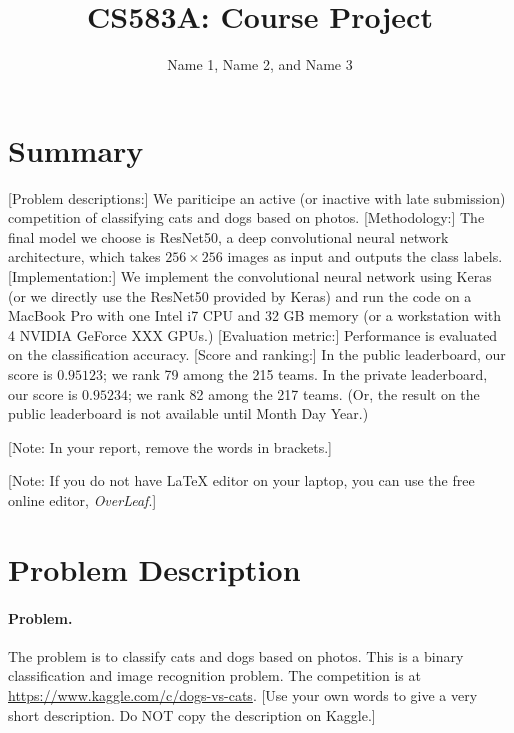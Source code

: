 \documentclass[11pt]{article}
\numberwithin{equation}{section}
\begin{document}
\title{CS583A: Course Project}

\author{Name 1, Name 2, and Name 3}


\maketitle




\section{Summary}

[Problem descriptions:] We pariticipe an active (or inactive with late submission) competition of classifying cats and dogs based on photos. 
[Methodology:] The final model we choose is ResNet50, a deep convolutional neural network architecture, which takes $256\times 256$ images as input and outputs the class labels.
[Implementation:] We implement the convolutional neural network using Keras (or we directly use the ResNet50 provided by Keras) and run the code on a MacBook Pro with one Intel i7 CPU and 32 GB memory (or a workstation with 4 NVIDIA GeForce XXX GPUs.)
[Evaluation metric:] Performance is evaluated on the classification accuracy.
[Score and ranking:] In the public leaderboard, our score is $0.95123$; we rank 79 among the 215 teams. In the private leaderboard, our score is $0.95234$; we rank 82 among the 217 teams. (Or, the result on the public leaderboard is not available until Month Day Year.)

[Note: In your report, remove the words in brackets.]

[Note: If you do not have LaTeX editor on your laptop, you can use the free online editor, {\it OverLeaf}.]


\section{Problem Description}



\paragraph{Problem.}
The problem is to classify cats and dogs based on photos.
This is a binary classification and image recognition problem.
The competition is at \url{https://www.kaggle.com/c/dogs-vs-cats}.
[Use your own words to give a very short description. Do NOT copy the description on Kaggle.]
\end{document}
